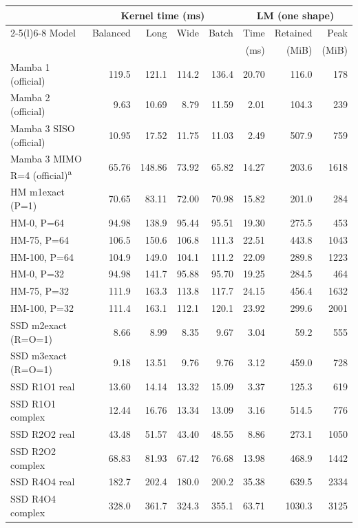 \begin{tabular}{@{}lrrrrrr@{\hspace{1.2em}}r@{}}
\toprule
& \multicolumn{4}{c}{Kernel time (ms)} & \multicolumn{3}{c}{LM (one shape)} \\
\cmidrule(lr){2-5}\cmidrule(l){6-8}
Model & Balanced & Long & Wide & Batch & Time & Retained & Peak \\
& & & & & (ms) & (MiB) & (MiB) \\
\midrule
Mamba 1 (official) & 119.5 & 121.1 & 114.2 & 136.4 & 20.70 & 116.0 & 178 \\
Mamba 2 (official) & 9.63 & 10.69 & 8.79 & 11.59 & 2.01 & 104.3 & 239 \\
Mamba 3 SISO (official) & 10.95 & 17.52 & 11.75 & 11.03 & 2.49 & 507.9 & 759 \\
Mamba 3 MIMO R=4 (official)\textsuperscript{a} & 65.76 & 148.86 & 73.92 & 65.82 & 14.27 & 203.6 & 1618 \\
\midrule
HM m1exact (P=1) & 70.65 & 83.11 & 72.00 & 70.98 & 15.82 & 201.0 & 284 \\
HM-0, P=64 & 94.98 & 138.9 & 95.44 & 95.51 & 19.30 & 275.5 & 453 \\
HM-75, P=64 & 106.5 & 150.6 & 106.8 & 111.3 & 22.51 & 443.8 & 1043 \\
HM-100, P=64 & 104.9 & 149.0 & 104.1 & 111.2 & 22.09 & 289.8 & 1223 \\
HM-0, P=32 & 94.98 & 141.7 & 95.88 & 95.70 & 19.25 & 284.5 & 464 \\
HM-75, P=32 & 111.9 & 163.3 & 113.8 & 117.7 & 24.15 & 456.4 & 1632 \\
HM-100, P=32 & 111.4 & 163.1 & 112.1 & 120.1 & 23.92 & 299.6 & 2001 \\
\midrule
SSD m2exact (R=O=1) & 8.66 & 8.99 & 8.35 & 9.67 & 3.04 & 59.2 & 555 \\
SSD m3exact (R=O=1) & 9.18 & 13.51 & 9.76 & 9.76 & 3.12 & 459.0 & 728 \\
SSD R1O1 real & 13.60 & 14.14 & 13.32 & 15.09 & 3.37 & 125.3 & 619 \\
SSD R1O1 complex & 12.44 & 16.76 & 13.34 & 13.09 & 3.16 & 514.5 & 776 \\
SSD R2O2 real & 43.48 & 51.57 & 43.40 & 48.55 & 8.86 & 273.1 & 1050 \\
SSD R2O2 complex & 68.83 & 81.93 & 67.42 & 76.68 & 13.98 & 468.9 & 1442 \\
SSD R4O4 real & 182.7 & 202.4 & 180.0 & 200.2 & 35.38 & 639.5 & 2334 \\
SSD R4O4 complex & 328.0 & 361.7 & 324.3 & 355.1 & 63.71 & 1030.3 & 3125 \\
\bottomrule
\end{tabular}
